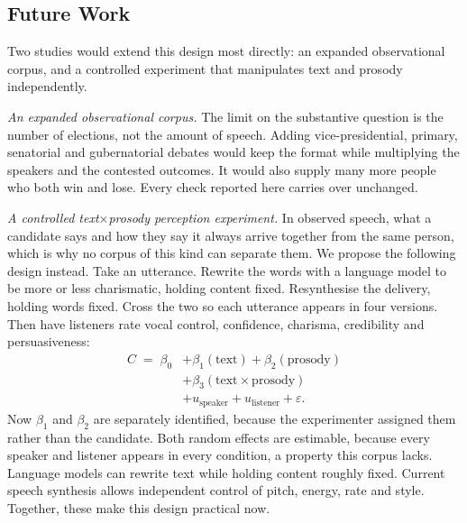 \documentclass[pdflatex,sn-mathphys-num]{sn-jnl}%
\begin{document}
\subsection{Future Work}
\label{sec:concl:future}

Two studies would extend this design most directly: an expanded
observational corpus, and a controlled experiment that manipulates text and
prosody independently.

\emph{An expanded observational corpus.} The limit on the substantive
question is the number of elections, not the amount of speech. Adding
vice-presidential, primary, senatorial and gubernatorial debates would keep
the format while multiplying the speakers and the contested outcomes. It
would also supply many more people who both win and lose. Every check reported
here carries over unchanged.

\emph{A controlled text$\times$prosody perception experiment.} In observed
speech, what a candidate says and how they say it always arrive together
from the same person, which is why no corpus of this kind can separate
them. We propose the following design instead. Take an utterance. Rewrite
the words with a language model to be more or less charismatic, holding
content fixed. Resynthesise the delivery, holding words fixed. Cross the two
so each utterance appears in four versions. Then have listeners rate vocal
control, confidence, charisma, credibility and persuasiveness:
\begin{equation}
\begin{split}
C \;=\; \beta_0 &+ \beta_1(\text{text}) + \beta_2(\text{prosody}) \\
                &+ \beta_3(\text{text} \times \text{prosody}) \\
                &+ u_{\text{speaker}} + u_{\text{listener}} + \varepsilon .
\end{split}
\label{eq:factorial}
\end{equation}
Now $\beta_1$ and $\beta_2$ are separately identified, because the
experimenter assigned them rather than the candidate. Both random
effects are estimable, because every speaker and listener appears in every
condition, a property this corpus lacks. Language models can rewrite text
while holding content roughly fixed. Current speech synthesis allows
independent control of pitch, energy, rate and style. Together, these make
this design practical now.
\end{document}
